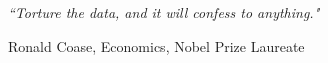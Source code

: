 \documentclass[11pt, oneside]{Thesis} %
\begin{document}
\pagestyle{empty} %

\null\vfill %

\textit{``Torture the data, and it will confess to anything."}

\begin{flushright}
Ronald Coase, Economics, Nobel Prize Laureate
\end{flushright}

\vfill\vfill\vfill\vfill\vfill\vfill\null %

\clearpage %


\end{document}
